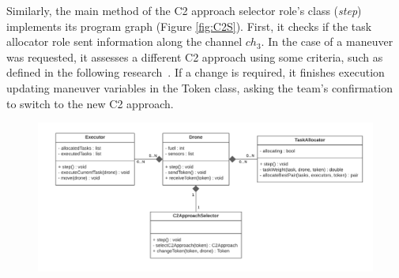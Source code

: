 Similarly, the main method of the C2 approach selector role's class (\textit{step}) implements its program graph (Figure \ref{fig:C2S}). First, it checks if the task allocator role sent information along the channel $ch_3$. In the case of a maneuver was requested, it assesses a different C2 approach using some criteria, such as defined in the following research~\cite{france2014}. If a change is required, it finishes execution updating maneuver variables in the Token class, asking the team's confirmation to switch to the new C2 approach.

\begin{figure}
  \centering
  \includegraphics[width=0.95\linewidth]{figures/DiagramaClasse.png}
  \label{fig:ClassDiagram}
\end{figure}





